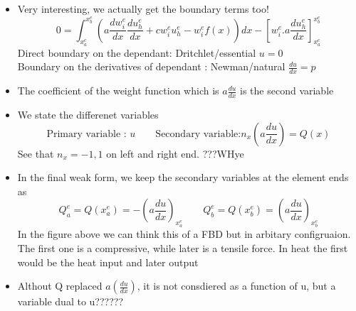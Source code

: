 	\begin{frame}
		\begin{itemize}
			\item Very interesting, we actually get the boundary terms too!
			\begin{equation}
			0 = \int_{x_a^e}^{x_b^e} \left( a\frac{d w_i^e}{dx} \frac{du_h^e}{dx}  + cw^e_iu_h^e -w_i^ef(x) \right)  dx
			-\left[ w_i^e. a \frac{du_h^e}{dx}\right]_{x_a^e}^{x_b^e}
			\end{equation}
			Direct boundary on the dependant: Dritchlet/essential $u = 0$ \\
			Boundary on the derivatives of dependant : Newman/natural $\frac{du}{dx} = p$
			\item The coefficient of the weight function which is $a\frac{du}{dx}$ is the second variable
			\item We state the differenet variables
			\begin{equation}
			\text{Primary variable : } u\qquad \text{Secondary variable:} n_x(a\frac{du}{dx}) = Q(x)
			\end{equation}
			See that $n_x = -1,1$ on left and right end. ???WHye
			\item In the final weak form, we keep the secondary variables at the element ends as
			\begin{equation}
			Q_a^e = Q(x_a^e) = -\left(a \frac{du}{dx} \right)_{x_a^e} \qquad 	Q_b^e = Q(x_b^e) = \left(a \frac{du}{dx} \right)_{x_b^e}
			\end{equation}
			In the figure above we can think this of a FBD but in arbitary configruaion. The first one is a compressive, while later is a tensile force. In heat the first would be the heat input and later output
			\item Althout Q replaced $a(\frac{du}{dx})$, it is not consdiered as a function of u, but a variable dual to u??????
		\end{itemize}
	\end{frame}



